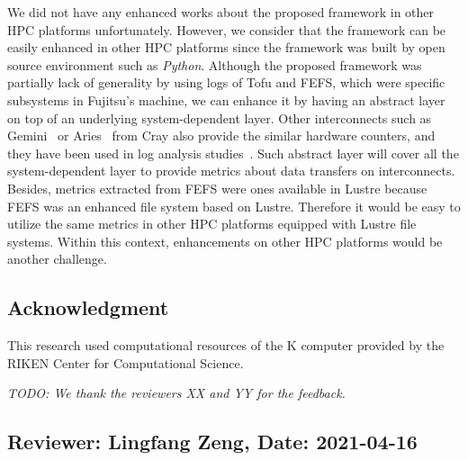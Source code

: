 \documentclass{jhps}
\begin{document}
We did not have any enhanced works about the proposed framework
in other HPC platforms unfortunately.
However, we consider that the framework can be easily enhanced
in other HPC platforms since the framework was built
by open source environment such as {\itshape Python}.
Although the proposed framework was partially lack of generality
by using logs of Tofu and FEFS, which were specific subsystems in Fujitsu's machine,
we can enhance it by having an abstract layer
on top of an underlying system-dependent layer.
Other interconnects such as Gemini~\cite{alverson:hoti10,pedretti:cug13} or
Aries~\cite{cray:aries_overview,cray:aries_hardware_counters}
from Cray also provide the similar hardware counters,
and they have been used in
log analysis studies~\cite{chunduri:pmbs19,ahlgren:cug18,zimmer:cug16,pedretti:cug13}.
Such abstract layer will cover all the system-dependent layer to
provide metrics about data transfers on interconnects.
Besides, metrics extracted from FEFS were ones available in Lustre
because FEFS was an enhanced file system based on Lustre.
Therefore it would be easy to utilize the same metrics in
other HPC platforms equipped with Lustre file systems.
Within this context, enhancements on other HPC platforms would be
another challenge.

\subsection*{Acknowledgment}

This research used computational resources of the K computer
provided by the RIKEN Center for Computational Science.

\textit{TODO: We thank the reviewers XX and YY for the feedback.}



\reviews   %

\subsection*{Reviewer: Lingfang Zeng, Date: 2021-04-16}
\end{document}
